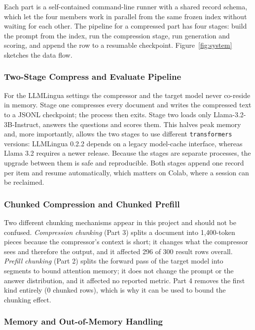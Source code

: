 \documentclass[10pt,a4paper,twocolumn]{article}
\begin{document}
Each part is a self-contained command-line runner with a shared record schema,
which let the four members work in parallel from the same frozen index without
waiting for each other. The pipeline for a compressed part has four stages: build
the prompt from the index, run the compression stage, run generation and scoring,
and append the row to a resumable checkpoint. Figure~\ref{fig:system} sketches the
data flow.

\subsubsection{Two-Stage Compress and Evaluate Pipeline}

For the LLMLingua settings the compressor and the target model never co-reside in
memory. Stage one compresses every document and writes the compressed text to a
JSONL checkpoint; the process then exits. Stage two loads only
Llama-3.2-3B-Instruct, answers the questions and scores them. This halves peak
memory and, more importantly, allows the two stages to use different
\texttt{transformers} versions: LLMLingua 0.2.2 depends on a legacy model-cache
interface, whereas Llama 3.2 requires a newer release. Because the stages are
separate processes, the upgrade between them is safe and reproducible. Both stages
append one record per item and resume automatically, which matters on Colab, where
a session can be reclaimed.

\subsubsection{Chunked Compression and Chunked Prefill}

Two different chunking mechanisms appear in this project and should not be
confused. \emph{Compression chunking} (Part 3) splits a document into
1{,}400-token pieces because the compressor's context is short; it changes what the
compressor sees and therefore the output, and it affected 296 of 300 result rows
overall. \emph{Prefill chunking} (Part 2) splits the forward pass of the target
model into segments to bound attention memory; it does not change the prompt or
the answer distribution, and it affected no reported metric. Part 4 removes the
first kind entirely (0 chunked rows), which is why it can be used to bound the
chunking effect.

\subsubsection{Memory and Out-of-Memory Handling}
\end{document}
